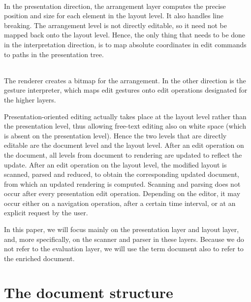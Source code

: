 \documentclass{article}[10pt]
\begin{document}
\\
In the presentation direction, the arrangement layer computes the precise position and size for each element in the layout level. It also handles line breaking. The arrangement level is not directly editable, so it need not be mapped back onto the layout level. Hence, the only thing that needs to be done in the interpretation direction, is to map absolute coordinates in edit commands to paths in the presentation tree. 

\\
The renderer creates a bitmap for the arrangement. In the other direction is the gesture interpreter, which maps edit gestures onto edit operations designated for the higher layers.

\ec





Presentation-oriented editing actually takes place at the layout level rather than the presentation level, thus allowing free-text editing also on white space (which is absent on the presentation level). Hence the two levels that are directly editable are the document level and the layout level. After an edit operation on the document, all levels from document to rendering are updated to reflect the update. After an edit operation on the layout level, the modified layout is scanned, parsed and reduced, to obtain the corresponding updated document, from which an updated rendering is computed. Scanning and parsing does not occur after every presentation edit operation. Depending on the editor, it may occur either on a navigation operation, after a certain time interval, or at an explicit request by the user.

In this paper, we will focus mainly on the presentation layer and layout layer, and, more specifically, on the scanner and parser in these layers. Because we do not refer to the evaluation layer, we will use the term document also to refer to the enriched document. 



%
\section{The document structure}\label{sect:documentStructure}
%
\end{document}
